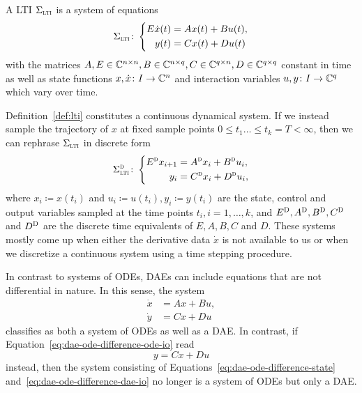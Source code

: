 \begin{definition}\label{def:lti}
    A \acl{LTI} $\Sigma_{\textnormal{\scshape lti}}$ is a system of equations
    \begin{equation}\label{eq:lti}
        \Sigma_{\textnormal{\scshape lti}} \colon \left\lbrace
        \begin{aligned}
            E \dot{x}(t) &= A x(t) + B u(t), \\
            y(t) &= C x(t) + D u(t)
        \end{aligned}
        \right.
    \end{equation}
    with the matrices $A, E \in \mathbb{C}^{n \times n}, B \in \mathbb{C}^{n \times q}, C \in \mathbb{C}^{q \times n}, D \in \mathbb{C}^{q \times q}$ constant in time as well as state functions $x, \dot{x} \colon I \to \mathbb{C}^n$ and interaction variables $u, y \colon I \to \mathbb{C}^q$ which vary over time.
\end{definition}

\begin{remark}
    Definition~\ref{def:lti} constitutes a continuous dynamical system.
    If we instead sample the trajectory of $x$ at fixed sample points $0 \leq t_1 \dots \leq t_k = T < \infty$, then we can rephrase $\Sigma_{\textnormal{\scshape lti}}$ in discrete form
    \begin{equation*}
        \Sigma_{\textnormal{\scshape lti}}^{\textnormal{\scshape d}} \colon \left\lbrace
        \begin{aligned}
            E^{\textnormal{\scshape d}} x_{i + 1} &= A^{\textnormal{\scshape d}} x_i + B^{\textnormal{\scshape d}} u_i, \\
            y_i &= C^{\textnormal{\scshape d}} x_i + D^{\textnormal{\scshape d}} u_i,
        \end{aligned}
        \right.
    \end{equation*}
    where $x_i \coloneqq x(t_i)$ and $u_i \coloneqq u(t_i), y_i \coloneqq y(t_i)$ are the state, control and output variables sampled at the time points $t_i, i = 1, \dots, k$, and $E^{\textnormal{\scshape D}}, A^{\textnormal{\scshape D}}, B^{\textnormal{\scshape D}}, C^{\textnormal{\scshape D}}$ and $D^{\textnormal{\scshape D}}$ are the discrete time equivalents of $E, A, B, C$ and $D$.
    These systems mostly come up when either the derivative data $\dot{x}$ is not available to us or when we discretize a continuous system using a time stepping procedure.
\end{remark}

\begin{remark}
    In contrast to systems of \acp{ODE}, \acp{DAE} can include equations that are not differential in nature.
    In this sense, the system
    \begin{align}
        \dot{x} &= A x + B u, \label{eq:dae-ode-difference-state}\\
        \dot{y} &= C x + D u\label{eq:dae-ode-difference-ode-io}
    \end{align}
    classifies as both a system of \acp{ODE} as well as a \ac{DAE}.
    In contrast, if Equation~\eqref{eq:dae-ode-difference-ode-io} read
    \begin{equation}\label{eq:dae-ode-difference-dae-io}
        y = C x + D u
    \end{equation}
    instead, then the system consisting of Equations~\eqref{eq:dae-ode-difference-state} and~\eqref{eq:dae-ode-difference-dae-io} no longer is a system of \acp{ODE} but only a \ac{DAE}.
\end{remark}


